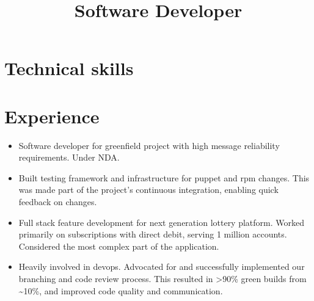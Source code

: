 \documentclass[11pt,a4paper,roman]{moderncv}
\title{Software Developer}
\begin{document}
\makecvtitle

\section{Technical skills}

\section{Experience}

\begin{itemize}
\item Software developer for greenfield project with high message reliability requirements. Under NDA.\newline
\item Built testing framework and infrastructure for puppet and rpm changes. This was made part of the project's continuous integration, enabling quick feedback on changes.\newline
\end{itemize}

\vspace{5mm}

\begin{itemize}
\item Full stack feature development for next generation lottery platform. Worked primarily on subscriptions with direct debit, serving 1 million accounts. Considered the most complex part of the application.\newline
\item Heavily involved in devops. Advocated for and successfully implemented our branching and code review process. This resulted in >90\% green builds from \textasciitilde10\%, and improved code quality and communication.\newline
\end{itemize}
\end{document}
